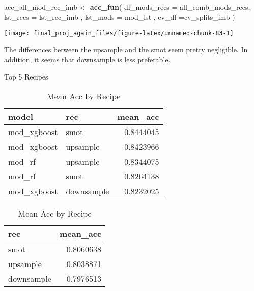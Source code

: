 \documentclass[
]{article}
\newenvironment{Shaded}{\begin{snugshade}}{\end{snugshade}}
\newcommand{\DataTypeTok}[1]{\textcolor[rgb]{0.13,0.29,0.53}{#1}}
\newcommand{\KeywordTok}[1]{\textcolor[rgb]{0.13,0.29,0.53}{\textbf{#1}}}
\newcommand{\NormalTok}[1]{#1}
\newcommand{\StringTok}[1]{\textcolor[rgb]{0.31,0.60,0.02}{#1}}
\begin{document}
\begin{Shaded}
\begin{Highlighting}[]
\NormalTok{acc_all_mod_rec_imb <-}\StringTok{ }\KeywordTok{acc_fun}\NormalTok{( }\DataTypeTok{df_mods_recs =}\NormalTok{ all_comb_mods_recs, }\DataTypeTok{lst_recs =}\NormalTok{ lst_rec_imb  ,}
                                \DataTypeTok{lst_mods =}\NormalTok{ mod_lst , }\DataTypeTok{cv_df =}\NormalTok{cv_splits_imb ) }
\end{Highlighting}
\end{Shaded}

\begin{center}\texttt{[image: final\_proj\_again\_files/figure-latex/unnamed-chunk-83-1]} \end{center}

The differences between the upsample and the smot seem pretty
negligible. In addition, it seems that downsample is less preferable.

\captionsetup[table]{labelformat=empty}

\begin{table}[!htb]
\centering
\begin{minipage}{0.48\linewidth}
\caption{\label{tab:1}Top 5 Recipes}

\centering\begingroup\fontsize{9}{11}\selectfont

\begin{tabular}{llr}
\toprule
model & rec & mean\_acc\\
\midrule
\rowcolor{gray!6}  mod\_xgboost & smot & 0.8444045\\
mod\_xgboost & upsample & 0.8423966\\
\rowcolor{gray!6}  mod\_rf & upsample & 0.8344075\\
mod\_rf & smot & 0.8264138\\
\rowcolor{gray!6}  mod\_xgboost & downsample & 0.8232025\\
\bottomrule
\end{tabular}
\endgroup{}
\end{minipage}
\begin{minipage}{0.48\linewidth}
\caption{\label{tab:2}Mean Acc by Recipe}
\centering\begingroup\fontsize{9}{11}\selectfont

\begin{tabular}{lr}
\toprule
rec & mean\_acc\\
\midrule
\rowcolor{gray!6}  smot & 0.8060638\\
upsample & 0.8038871\\
\rowcolor{gray!6}  downsample & 0.7976513\\
\bottomrule
\end{tabular}
\endgroup{}
\end{minipage}
\end{table}
\end{document}
